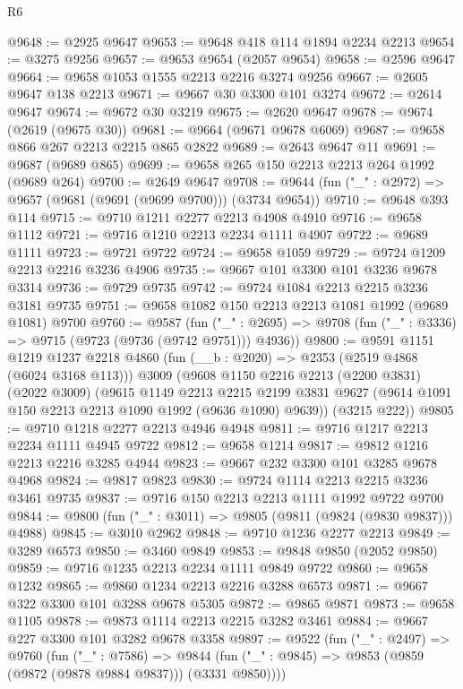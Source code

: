 \begin{lexlean}{R6}
\begin{coremodule}
@9648 := @2925 @9647
@9653 := @9648 @418 @114 @1894 @2234 @2213
@9654 := @3275 @9256
@9657 := @9653 @9654 (@2057 @9654)
@9658 := @2596 @9647
@9664 := @9658 @1053 @1555 @2213 @2216 @3274 @9256
@9667 := @2605 @9647 @138 @2213
@9671 := @9667 @30 @3300 @101 @3274
@9672 := @2614 @9647
@9674 := @9672 @30 @3219
@9675 := @2620 @9647
@9678 := @9674 (@2619 (@9675 @30))
@9681 := @9664 (@9671 @9678 @6069)
@9687 := @9658 @866 @267 @2213 @2215 @865 @2822
@9689 := @2643 @9647 @11
@9691 := @9687 (@9689 @865)
@9699 := @9658 @265 @150 @2213 @2213 @264 @1992 (@9689 @264)
@9700 := @2649 @9647
@9708 := @9644 (fun ("_" : @2972) => @9657 (@9681 (@9691 (@9699 @9700))) (@3734 @9654))
@9710 := @9648 @393 @114
@9715 := @9710 @1211 @2277 @2213 @4908 @4910
@9716 := @9658 @1112
@9721 := @9716 @1210 @2213 @2234 @1111 @4907
@9722 := @9689 @1111
@9723 := @9721 @9722
@9724 := @9658 @1059
@9729 := @9724 @1209 @2213 @2216 @3236 @4906
@9735 := @9667 @101 @3300 @101 @3236 @9678 @3314
@9736 := @9729 @9735
@9742 := @9724 @1084 @2213 @2215 @3236 @3181 @9735
@9751 := @9658 @1082 @150 @2213 @2213 @1081 @1992 (@9689 @1081) @9700
@9760 := @9587
    (fun ("_" : @2695) => @9708 (fun ("_" : @3336) => @9715 (@9723 (@9736 (@9742 @9751))) @4936))
@9800 := @9591
    @1151
    @1219
    @1237
    @2218
    @4860
    (fun (__b : @2020) => @2353 (@2519 @4868 (@6024 @3168 @113)))
    @3009
    (@9608
      @1150
      @2216
      @2213
      (@2200 @3831)
      (@2022 @3009)
      (@9615
        @1149
        @2213
        @2215
        @2199
        @3831
        @9627
        (@9614 @1091 @150 @2213 @2213 @1090 @1992 (@9636 @1090) @9639))
      (@3215 @222))
@9805 := @9710 @1218 @2277 @2213 @4946 @4948
@9811 := @9716 @1217 @2213 @2234 @1111 @4945 @9722
@9812 := @9658 @1214
@9817 := @9812 @1216 @2213 @2216 @3285 @4944
@9823 := @9667 @232 @3300 @101 @3285 @9678 @4968
@9824 := @9817 @9823
@9830 := @9724 @1114 @2213 @2215 @3236 @3461 @9735
@9837 := @9716 @150 @2213 @2213 @1111 @1992 @9722 @9700
@9844 := @9800 (fun ("_" : @3011) => @9805 (@9811 (@9824 (@9830 @9837))) @4988)
@9845 := @3010 @2962
@9848 := @9710 @1236 @2277 @2213
@9849 := @3289 @6573
@9850 := @3460 @9849
@9853 := @9848 @9850 (@2052 @9850)
@9859 := @9716 @1235 @2213 @2234 @1111 @9849 @9722
@9860 := @9658 @1232
@9865 := @9860 @1234 @2213 @2216 @3288 @6573
@9871 := @9667 @322 @3300 @101 @3288 @9678 @5305
@9872 := @9865 @9871
@9873 := @9658 @1105
@9878 := @9873 @1114 @2213 @2215 @3282 @3461
@9884 := @9667 @227 @3300 @101 @3282 @9678 @3358
@9897 := @9522
    (fun ("_" : @2497) =>
    @9760
      (fun ("_" : @7586) =>
      @9844 (fun ("_" : @9845) => @9853 (@9859 (@9872 (@9878 @9884 @9837))) (@3331 @9850))))

\end{coremodule}
\end{lexlean}
